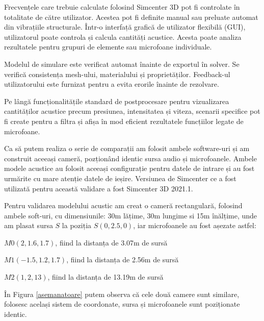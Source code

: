 	Frecvențele care trebuie calculate folosind Simcenter 3D pot fi controlate în totalitate de către utilizator. Acestea pot fi definite manual sau preluate automat din vibrațiile structurale. Într-o interfață grafică de utilizator flexibilă (GUI), utilizatorul poate controla și calcula cantități acustice. Acesta poate analiza rezultatele pentru grupuri de elemente sau microfoane individuale.
	
	Modelul de simulare este verificat automat înainte de exportul în
	solver. Se verifică consistența mesh-ului, materialului și proprietăților. Feedback-ul utilizatorului este furnizat pentru a evita erorile înainte de rezolvare.
	
	Pe lângă funcționalitățile standard de postprocesare pentru vizualizarea
	cantităților acustice precum presiunea, intensitatea și viteza, scenarii specifice pot fi create pentru a filtra și afișa în mod eficient rezultatele funcțiilor legate de microfoane.
	
	Ca să putem realiza o serie de comparații am folosit ambele software-uri și am construit aceeași cameră, pozționând identic sursa audio și microfoanele. Ambele modele acustice au folosit aceeași configurație pentru datele de intrare și au fost urmărite cu mare atenție datele de ieșire. Versiunea de Simcenter ce a fost utilizată pentru această validare a fost Simcenter 3D 2021.1. 
	
	Pentru validarea modelului acustic am creat o cameră rectangulară, folosind ambele soft-uri, cu dimensiunile: 30m lățime, 30m lungime si 15m înălțime, unde am plasat sursa $S$ la poziția $S(0, 2.5,0)$, iar microfoanele au fost așezate astfel: 
	
	\begin{itemize}
		\utb $M0(2, 1.6, 1.7)$, fiind la distanța de 3.07m de sursă
		
		\utb $M1(-1.5, 1.2, 1.7)$, fiind la distanța de 2.56m de sursă
		
		\utb $M2(1, 2, 13)$, fiind la distanța de 13.19m de sursă
	\end{itemize}
	
	În Figura \ref{asemanatoare} putem observa că cele două camere sunt similare, folosesc același sistem de coordonate, sursa și microfoanele sunt poziționate identic.
		
